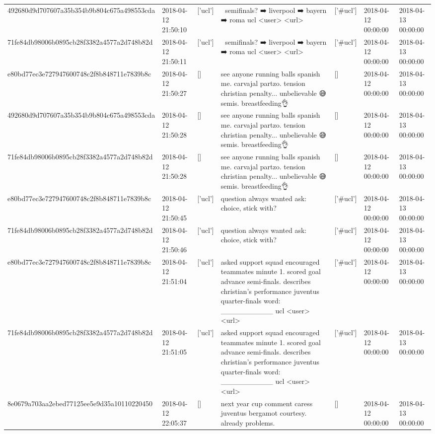 \begin{tabular}{lllllll}
492680d9d707607a35b354b9b804c675a498553cda & 2018-04-12 21:50:10 & ['ucl'] & 🤔 semifinals? ➡️ liverpool ➡️ bayern ➡️ roma ucl <user> <url> & ['#ucl'] & 2018-04-12 00:00:00 & 2018-04-13 00:00:00 \\
71fe84db98006b0895cb28f3382a4577a2d748b82d & 2018-04-12 21:50:11 & ['ucl'] & 🤔 semifinals? ➡️ liverpool ➡️ bayern ➡️ roma ucl <user> <url> & ['#ucl'] & 2018-04-12 00:00:00 & 2018-04-13 00:00:00 \\
e80bd77ec3e727947600748c2f8b848711e7839b8c & 2018-04-12 21:50:27 & [] & see anyone running balls spanish me. carvajal partzo. tension christian penalty... unbelievable 😅 semis. breastfeeding👌 & [] & 2018-04-12 00:00:00 & 2018-04-13 00:00:00 \\
492680d9d707607a35b354b9b804c675a498553cda & 2018-04-12 21:50:28 & [] & see anyone running balls spanish me. carvajal partzo. tension christian penalty... unbelievable 😅 semis. breastfeeding👌 & [] & 2018-04-12 00:00:00 & 2018-04-13 00:00:00 \\
71fe84db98006b0895cb28f3382a4577a2d748b82d & 2018-04-12 21:50:28 & [] & see anyone running balls spanish me. carvajal partzo. tension christian penalty... unbelievable 😅 semis. breastfeeding👌 & [] & 2018-04-12 00:00:00 & 2018-04-13 00:00:00 \\
e80bd77ec3e727947600748c2f8b848711e7839b8c & 2018-04-12 21:50:45 & ['ucl'] & question always wanted ask: choice, stick with? & ['#ucl'] & 2018-04-12 00:00:00 & 2018-04-13 00:00:00 \\
71fe84db98006b0895cb28f3382a4577a2d748b82d & 2018-04-12 21:50:46 & ['ucl'] & question always wanted ask: choice, stick with? & ['#ucl'] & 2018-04-12 00:00:00 & 2018-04-13 00:00:00 \\
e80bd77ec3e727947600748c2f8b848711e7839b8c & 2018-04-12 21:51:04 & ['ucl'] & asked support squad encouraged teammates minute 1. scored goal advance semi-finals. describes christian's performance juventus quarter-finals word: \_\_\_\_\_\_\_\_\_\_ ucl <user> <url> & ['#ucl'] & 2018-04-12 00:00:00 & 2018-04-13 00:00:00 \\
71fe84db98006b0895cb28f3382a4577a2d748b82d & 2018-04-12 21:51:05 & ['ucl'] & asked support squad encouraged teammates minute 1. scored goal advance semi-finals. describes christian's performance juventus quarter-finals word: \_\_\_\_\_\_\_\_\_\_ ucl <user> <url> & ['#ucl'] & 2018-04-12 00:00:00 & 2018-04-13 00:00:00 \\
8e0679a703aa2ebed77125ee5e9d35a10110220450 & 2018-04-12 22:05:37 & [] & next year cup comment caress juventus bergamot courtesy. already problems. & [] & 2018-04-12 00:00:00 & 2018-04-13 00:00:00 \\

\end{tabular}
